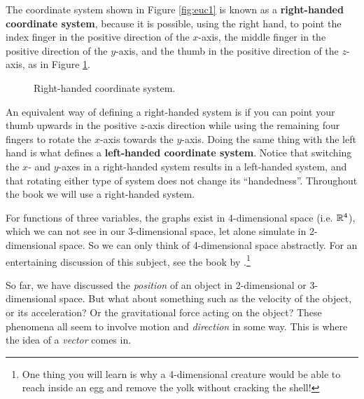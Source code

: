 The coordinate system shown in Figure \ref{fig:euc1} is known as a
\textbf{right-handed coordinate system}, because
it is possible, using the right hand, to point the index finger in the positive direction of the $x$-axis,
the middle finger in the positive direction of the $y$-axis, and the thumb in the positive direction of the
$z$-axis, as in Figure \ref{fig:rhs}.

\begin{figure}[h]
 \begin{center}
  
 \end{center}
 \caption[]{\quad Right-handed coordinate system.}
 \label{fig:rhs}
\end{figure}

An equivalent way of defining a right-handed system is if you can point your thumb upwards in the positive
$z$-axis direction while using the remaining four fingers to rotate the $x$-axis towards the $y$-axis.
Doing the same thing
with the left hand is what defines a \textbf{left-handed coordinate system}.
Notice that switching the $x$- and $y$-axes
in a right-handed system results in a left-handed system, and that rotating either type of system does not change its
``handedness''.  Throughout the book we will use a right-handed system.

For functions of three variables, the graphs exist in 4-dimensional space (i.e. $\mathbb{R}^{4}$),
which we can not see in our 3-dimensional space, let alone simulate in 2-dimensional space.  So we
can only think of 4-dimensional space abstractly.  For an entertaining discussion of this subject, see the book by
\cite{abb}.\footnote{One thing you will learn is why a 4-dimensional creature would be able to reach inside an egg and
remove the yolk without cracking the shell!}

So far, we have discussed the \emph{position} of an object in 2-dimensional or 3-dimensional space.
But what about something such as the velocity of the object, or its acceleration?
Or the gravitational force acting on the object? These phenomena all seem to involve motion and \emph{direction} in some
way.  This is where the idea of a \emph{vector} comes in.

